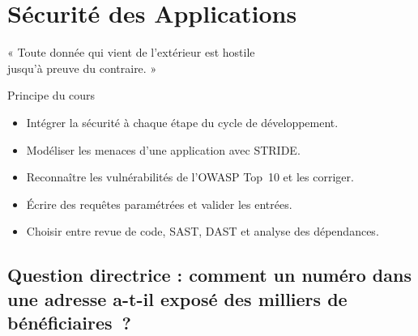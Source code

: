 
\chapter{Sécurité des Applications}
\label{chap:applications}

\epigraph{%
    « Toute donnée qui vient de l'extérieur est hostile\\
    jusqu'à preuve du contraire. »%
}{Principe du cours}


\begin{boxobjectifs}
\begin{itemize}
    \item Intégrer la sécurité à chaque étape du cycle de développement.
    \item Modéliser les menaces d'une application avec STRIDE.
    \item Reconnaître les vulnérabilités de l'OWASP Top~10 et les corriger.
    \item Écrire des requêtes paramétrées et valider les entrées.
    \item Choisir entre revue de code, SAST, DAST et analyse des
          dépendances.
\end{itemize}
\end{boxobjectifs}

\bigskip

\section*{Question directrice : comment un numéro dans une adresse a-t-il exposé des milliers de bénéficiaires~?}

